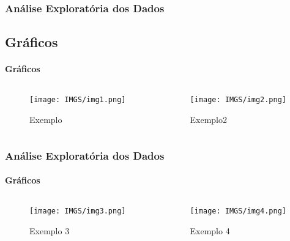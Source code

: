 \documentclass{beamer}
\begin{document}
\begin{frame}
\frametitle{Análise Exploratória dos Dados}
\subsection{Gráficos}
\framesubtitle{Gráficos}
\begin{columns}
    \begin{column}{0.5\textwidth}
        \begin{figure}[h]
            \caption{Exemplo}
            \centering %
            \texttt{[image: IMGS/img1.png]}
            \label{figura:distidade}
        \end{figure}
    \end{column}
    \begin{column}{0.5\textwidth}
        \begin{figure}[h]
            \caption{Exemplo2}
            \texttt{[image: IMGS/img2.png]}
            \label{figura:fig2}
        \end{figure}
    \end{column}
    \end{columns} 
\end{frame}


\begin{frame}
\frametitle{Análise Exploratória dos Dados}
\framesubtitle{Gráficos}


\begin{columns}
    \begin{column}{0.5\textwidth}
        \begin{figure}[h]
            \caption{Exemplo 3}
            \centering %
            \texttt{[image: IMGS/img3.png]}
            \label{figura:distidade}
        \end{figure}
    \end{column}
    \begin{column}{0.5\textwidth}
        \begin{figure}[h]
            \caption{Exemplo 4}
            \centering %
            \texttt{[image: IMGS/img4.png]}
            \label{figura:fig4}
        \end{figure}
    \end{column}
    \end{columns} 
      
\end{frame}
\end{document}
